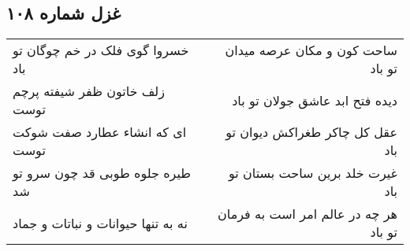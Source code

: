 \begin{center}
\section*{غزل شماره ۱۰۸}
\label{sec:sh108}
\begin{longtable}{l p{0.5cm} r}
خسروا گوی فلک در خم چوگان تو باد
&&
ساحت کون و مکان عرصه میدان تو باد
\\
زلف خاتون ظفر شیفته پرچم توست
&&
دیده فتح ابد عاشق جولان تو باد
\\
ای که انشاء عطارد صفت شوکت توست
&&
عقل کل چاکر طغراکش دیوان تو باد
\\
طیره جلوه طوبی قد چون سرو تو شد
&&
غیرت خلد برین ساحت بستان تو باد
\\
نه به تنها حیوانات و نباتات و جماد
&&
هر چه در عالم امر است به فرمان تو باد
\\
\end{longtable}
\end{center}
